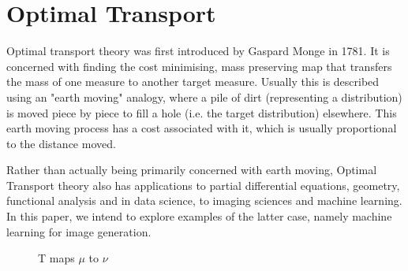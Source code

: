 \chapter{Optimal Transport}
\label{chp:optimal-transport}

\newcommand{\X}{\mathcal{X}}

Optimal transport theory was first introduced by Gaspard Monge in 1781. It is concerned with finding the cost minimising, mass preserving map that transfers the mass of one measure to another target measure. Usually this is described using an "earth moving" analogy, where a pile of dirt (representing a distribution) is moved piece by piece to fill a hole (i.e. the target distribution) elsewhere. This earth moving process has a cost associated with it, which is usually proportional to the distance moved.

Rather than actually being primarily concerned with earth moving, Optimal Transport theory also has applications to partial differential equations, geometry, functional analysis and in data science, to imaging sciences and machine learning. In this paper, we intend to explore examples of the latter case, namely machine learning for image generation.

\begin{figure}
\caption{T maps $\mu$ to $\nu$}
\centering
{}
\end{figure}

